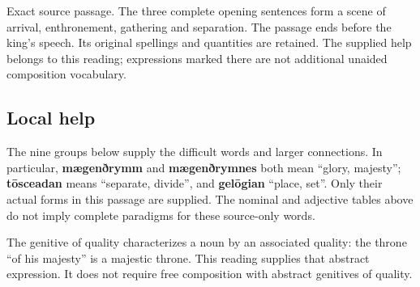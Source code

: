 Exact source passage. The three complete opening sentences form a scene of arrival, enthronement, gathering and separation. The passage ends before the king's speech. Its original spellings and quantities are retained. The supplied help belongs to this reading; expressions marked there are not additional unaided composition vocabulary.

\par\begin{minipage}{\linewidth}\raggedright

\end{minipage}\par
{}
\subsection*{Local help}

The nine groups below supply the difficult words and larger connections. In particular, \textbf{mægenðrymm} and \textbf{mægenðrymnes} both mean “glory, majesty”; \textbf{tōsceadan} means “separate, divide”, and \textbf{gelōgian} “place, set”. Only their actual forms in this passage are supplied. The nominal and adjective tables above do not imply complete paradigms for these source-only words.

The genitive of quality characterizes a noun by an associated quality: the throne “of his majesty” is a majestic throne. This reading supplies that abstract expression. It does not require free composition with abstract genitives of quality.

